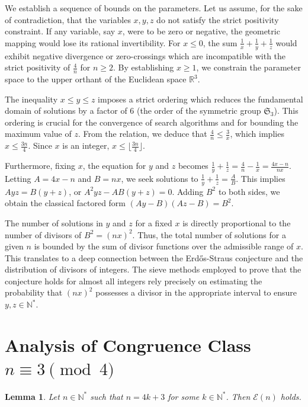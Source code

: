 \documentclass[12pt, a4paper]{article}
\newtheorem{lemma}[theorem]{Lemma}
\theoremstyle{definition}
\theoremstyle{remark}
\begin{document}
We establish a sequence of bounds on the parameters. Let us assume, for the sake of contradiction, that the variables $x, y, z$ do not satisfy the strict positivity constraint. If any variable, say $x$, were to be zero or negative, the geometric mapping would lose its rational invertibility. For $x \le 0$, the sum $\frac{1}{x} + \frac{1}{y} + \frac{1}{z}$ would exhibit negative divergence or zero-crossings which are incompatible with the strict positivity of $\frac{4}{n}$ for $n \ge 2$. By establishing $x \ge 1$, we constrain the parameter space to the upper orthant of the Euclidean space $\mathbb{R}^3$.

The inequality $x \le y \le z$ imposes a strict ordering which reduces the fundamental domain of solutions by a factor of 6 (the order of the symmetric group $\mathfrak{S}_3$). This ordering is crucial for the convergence of search algorithms and for bounding the maximum value of $z$. From the relation, we deduce that $\frac{4}{n} \le \frac{3}{x}$, which implies $x \le \frac{3n}{4}$. Since $x$ is an integer, $x \le \lfloor \frac{3n}{4} \rfloor$.

Furthermore, fixing $x$, the equation for $y$ and $z$ becomes $\frac{1}{y} + \frac{1}{z} = \frac{4}{n} - \frac{1}{x} = \frac{4x - n}{nx}$. Letting $A = 4x - n$ and $B = nx$, we seek solutions to $\frac{1}{y} + \frac{1}{z} = \frac{A}{B}$. This implies $Ayz = B(y+z)$, or $A^2 y z - AB(y+z) = 0$. Adding $B^2$ to both sides, we obtain the classical factored form $(Ay - B)(Az - B) = B^2$.

The number of solutions in $y$ and $z$ for a fixed $x$ is directly proportional to the number of divisors of $B^2 = (nx)^2$. Thus, the total number of solutions for a given $n$ is bounded by the sum of divisor functions over the admissible range of $x$. This translates to a deep connection between the Erd\H{o}s-Straus conjecture and the distribution of divisors of integers. The sieve methods employed to prove that the conjecture holds for almost all integers rely precisely on estimating the probability that $(nx)^2$ possesses a divisor in the appropriate interval to ensure $y, z \in \mathbb{N}^*$.

\section{Analysis of Congruence Class $n \equiv 3 \pmod 4$}

\begin{lemma}
Let $n \in \mathbb{N}^*$ such that $n = 4k + 3$ for some $k \in \mathbb{N}^*$. Then $\mathcal{E}(n)$ holds.
\end{lemma}
\end{document}
